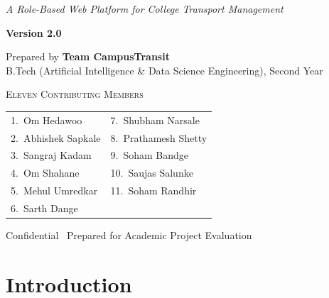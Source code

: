 \documentclass[11pt,a4paper]{report}
\begin{document}
\begin{titlepage}
\begin{center}
\vspace{0.75cm}
{\color{pinelight}\Large\itshape A Role-Based Web Platform for College Transport Management}

\vspace{1.5cm}
{\color{inktext}\large\bfseries Version 2.0} \quad {\color{softgray}\large\textbar} \quad {\color{inktext}\large \today}
\end{center}

\vspace{1.7cm}
\begin{center}
{\color{softgray}\large Prepared by \textbf{\color{pine}Team CampusTransit}}\\[3pt]
{\color{softgray}\small B.Tech (Artificial Intelligence \& Data Science Engineering), Second Year}

\vspace{0.55cm}
{\color{brass}\footnotesize\textsc{Eleven Contributing Members}}\\[7pt]
\begin{tabular}{p{5.3cm}p{5.3cm}}
{\color{inktext}\footnotesize 1.\ Om Hedawoo} & {\color{inktext}\footnotesize 7.\ Shubham Narsale} \\[3pt]
{\color{inktext}\footnotesize 2.\ Abhishek Sapkale} & {\color{inktext}\footnotesize 8.\ Prathamesh Shetty} \\[3pt]
{\color{inktext}\footnotesize 3.\ Sangraj Kadam} & {\color{inktext}\footnotesize 9.\ Soham Bandge} \\[3pt]
{\color{inktext}\footnotesize 4.\ Om Shahane} & {\color{inktext}\footnotesize 10.\ Saujas Salunke} \\[3pt]
{\color{inktext}\footnotesize 5.\ Mehul Umredkar} & {\color{inktext}\footnotesize 11.\ Soham Randhir} \\[3pt]
{\color{inktext}\footnotesize 6.\ Sarth Dange} & \\
\end{tabular}
\end{center}

\vfill
\begin{center}
{\color{white}\small Confidential \textbar\ Prepared for Academic Project Evaluation}
\end{center}
\vspace{0.55cm}
\restoregeometry
\end{titlepage}

\tableofcontents
\clearpage

\chapter{Introduction}
\end{document}
